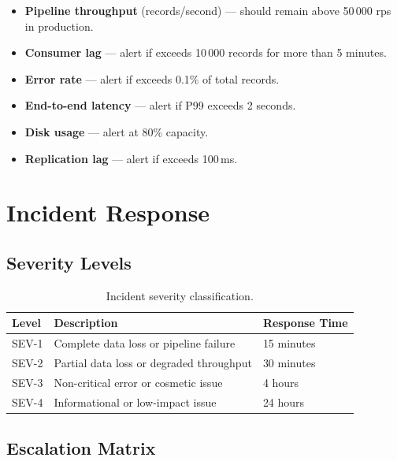 \documentclass[
    language=english,
    doctype=manual,
    institution=none,
    titlestyle=book,
    oneside,
]{omnilatex}
\begin{document}
\begin{itemize}
    \item \textbf{Pipeline throughput} (records/second) --- should remain
        above 50\,000 rps in production.
    \item \textbf{Consumer lag} --- alert if exceeds 10\,000 records for
        more than 5 minutes.
    \item \textbf{Error rate} --- alert if exceeds 0.1\% of total records.
    \item \textbf{End-to-end latency} --- alert if P99 exceeds 2 seconds.
    \item \textbf{Disk usage} --- alert at 80\% capacity.
    \item \textbf{Replication lag} --- alert if exceeds 100\,ms.
\end{itemize}

\chapter{Incident Response}
\label{sec:incident-response}

\section{Severity Levels}

\begin{table}[htbp]
    \centering
    \caption{Incident severity classification.}
    \label{tab:severity}
    \begin{tabular}{@{}lp{5cm}p{3cm}@{}}
        \toprule
        Level & Description & Response Time \\
        \midrule
        SEV-1 & Complete data loss or pipeline failure & 15 minutes \\
        SEV-2 & Partial data loss or degraded throughput & 30 minutes \\
        SEV-3 & Non-critical error or cosmetic issue & 4 hours \\
        SEV-4 & Informational or low-impact issue & 24 hours \\
        \bottomrule
    \end{tabular}
\end{table}

\section{Escalation Matrix}
\end{document}
